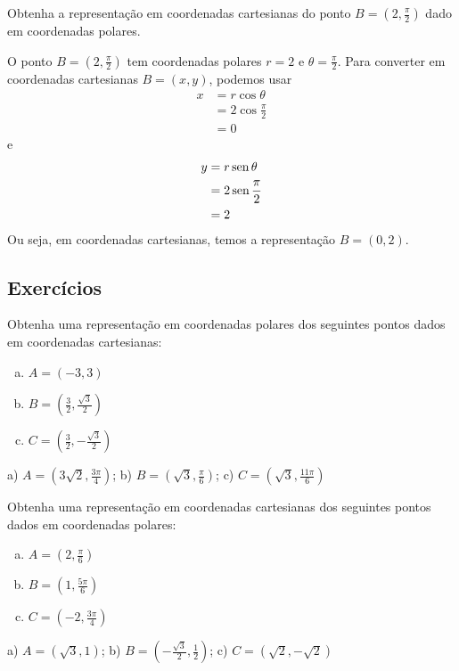 \begin{exeresol}
  Obtenha a representação em coordenadas cartesianas do ponto $B=(2, \frac{\pi}{2})$ dado em coordenadas polares.
\end{exeresol}
\begin{resol}
  O ponto $B=(2, \frac{\pi}{2})$ tem coordenadas polares $r=2$ e $\theta=\frac{\pi}{2}$. Para converter em coordenadas cartesianas $B=(x, y)$, podemos usar
  \begin{align}
    x &= r\cos\theta \\
      &= 2\cos\frac{\pi}{2} \\
      &= 0
  \end{align}
  e
  \begin{align}
    y &= r\operatorname{sen}\theta \\
      &= 2\operatorname{sen}\frac{\pi}{2} \\
      &= 2 
  \end{align}
  Ou seja, em coordenadas cartesianas, temos a representação $B=(0, 2)$.
\end{resol}

\subsection*{Exercícios}

\begin{exer}
  Obtenha uma representação em coordenadas polares dos seguintes pontos dados em coordenadas cartesianas:
  \begin{enumerate}[a)]
  \item $A=(-3, 3)$
  \item $B=(\frac{3}{2}, \frac{\sqrt{3}}{2})$
  \item $C=(\frac{3}{2}, -\frac{\sqrt{3}}{2})$
  \end{enumerate}
\end{exer}
\begin{resp}
  a) $A=(3\sqrt{2}, \frac{3\pi}{4})$; b) $B = (\sqrt{3}, \frac{\pi}{6})$; c) $C=(\sqrt{3}, \frac{11\pi}{6})$
\end{resp}

\begin{exer}
  Obtenha uma representação em coordenadas cartesianas dos seguintes pontos dados em coordenadas polares:
  \begin{enumerate}[a)]
  \item $A=(2, \frac{\pi}{6})$
  \item $B=(1, \frac{5 \pi}{6})$
  \item $C=(-2, \frac{3\pi}{4})$
  \end{enumerate}
\end{exer}
\begin{resp}
  a) $A=(\sqrt{3}, 1)$; b) $B = (-\frac{\sqrt{3}}{2}, \frac{1}{2})$; c) $C=(\sqrt{2}, -\sqrt{2})$
\end{resp}

